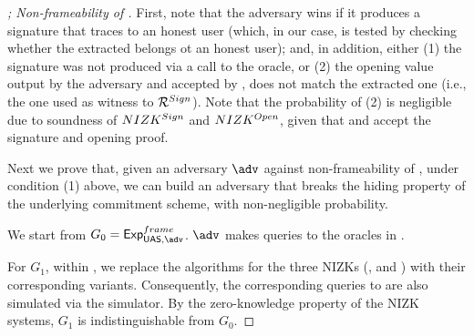 \begin{proof}[; Non-frameability of \CUASGen]
  First, note that the adversary wins if it produces a signature that traces to
  an honest user (which, in our case, is tested by checking whether the
  extracted \usk belongs ot an honest user); and, in addition, either (1) the
  signature was not produced via a call to the \SIGN oracle, or (2) the opening
  value output by the adversary and accepted by \Judge, does not match the
  extracted one (i.e., the one used as witness to $\mathcal{R}^{Sign}$). Note that
  the probability of (2) is negligible due to soundness of $NIZK^{Sign}$ and
  $NIZK^{Open}$, given that \Verify and \Judge accept the signature and
  opening proof.
  
  Next we prove that, given an adversary $\adv$ against non-frameability of
  \CUASGen, under condition (1) above, we can build an adversary \advB that
  breaks the hiding property of the underlying commitment scheme, with
  non-negligible probability.

  We start from $G_0=\ExpNonframe$. $\adv$ makes queries to the oracles in
  \Oframe.

  For $G_1$, within \Setup, we replace the \Setup algorithms for the three
  NIZKs (\Issue, \Sign and \Open) with their corresponding \SimSetup
  variants. Consequently, the corresponding queries to \Prove are also
  simulated via the simulator. By the zero-knowledge property of the NIZK
  systems, $G_1$ is indistinguishable from $G_0$.
  

\end{proof}
